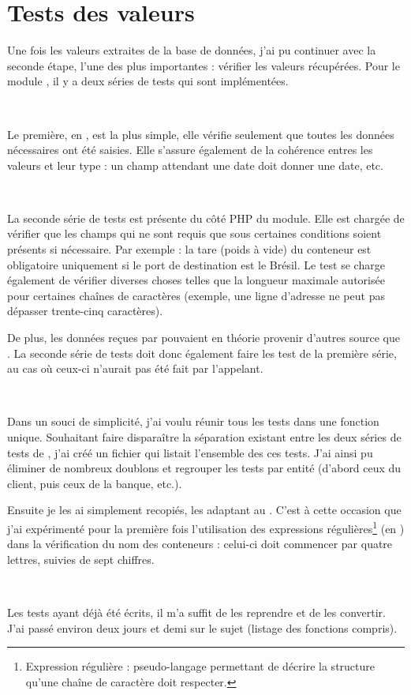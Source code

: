 \chapter{Tests des valeurs}
Une fois les valeurs extraites de la base de données, j'ai pu continuer avec la seconde étape, l'une des plus importantes : vérifier les valeurs récupérées. Pour le module \pireus, il y a deux séries de tests qui sont implémentées.

~

Le première, en \vb, est la plus simple, elle vérifie seulement que toutes les données nécessaires ont été saisies. Elle s'assure également de la cohérence entres les valeurs et leur type : un champ attendant une date doit donner une date, etc.

~

La seconde série de tests est présente du côté PHP du module. Elle est chargée de vérifier que les champs qui ne sont requis que sous certaines conditions soient présents si nécessaire. Par exemple : la tare (poids à vide) du conteneur est obligatoire uniquement si le port de destination est le Brésil. Le test se charge également de vérifier diverses choses telles que la longueur maximale autorisée pour certaines chaînes de caractères (exemple, une ligne d'adresse ne peut pas dépasser trente-cinq caractères).

De plus, les données reçues par \pireus{} pouvaient en théorie provenir d'autres source que \integrale. La seconde série de tests doit donc également faire les test de la première série, au cas où ceux-ci n'aurait pas été fait par l'appelant.

~

Dans un souci de simplicité, j'ai voulu réunir tous les tests dans une fonction unique. Souhaitant faire disparaître la séparation existant entre les deux séries de tests de \pireus, j'ai créé un fichier qui listait l'ensemble des ces tests. J'ai ainsi pu éliminer de nombreux doublons et regrouper les tests par entité (d'abord ceux du client, puis ceux de la banque, etc.).

Ensuite je les ai simplement recopiés, les adaptant au \vb. C'est à cette occasion que j'ai expérimenté pour la première fois l'utilisation des expressions régulières\footnote{Expression régulière : pseudo-langage permettant de décrire la structure qu'une chaîne de caractère doit respecter.} (en \vb) dans la vérification du nom des conteneurs : celui-ci doit commencer par quatre lettres, suivies de sept chiffres.

~

Les tests ayant déjà été écrits, il m'a suffit de les reprendre et de les convertir. J'ai passé environ deux jours et demi sur le sujet (listage des fonctions compris).